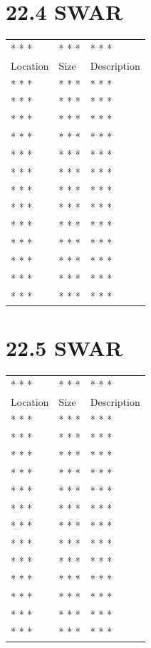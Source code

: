 \documentclass[
]{book}
\begin{document}
\hypertarget{swar}{%
\section{22.4 SWAR}\label{swar}}

\begin{longtable}[]{@{}lll@{}}
\toprule()
\endhead
* * * & * * * & * * * \\
Location & Size & Description \\
* * * & * * * & * * * \\
* * * & * * * & * * * \\
* * * & * * * & * * * \\
* * * & * * * & * * * \\
* * * & * * * & * * * \\
* * * & * * * & * * * \\
* * * & * * * & * * * \\
* * * & * * * & * * * \\
* * * & * * * & * * * \\
* * * & * * * & * * * \\
* * * & * * * & * * * \\
* * * & * * * & * * * \\
* * * & * * * & * * * \\
\bottomrule()
\end{longtable}

\hypertarget{swar-1}{%
\section{22.5 SWAR}\label{swar-1}}

\begin{longtable}[]{@{}lll@{}}
\toprule()
\endhead
* * * & * * * & * * * \\
Location & Size & Description \\
* * * & * * * & * * * \\
* * * & * * * & * * * \\
* * * & * * * & * * * \\
* * * & * * * & * * * \\
* * * & * * * & * * * \\
* * * & * * * & * * * \\
* * * & * * * & * * * \\
* * * & * * * & * * * \\
* * * & * * * & * * * \\
* * * & * * * & * * * \\
* * * & * * * & * * * \\
* * * & * * * & * * * \\
* * * & * * * & * * * \\
\bottomrule()
\end{longtable}
\end{document}
